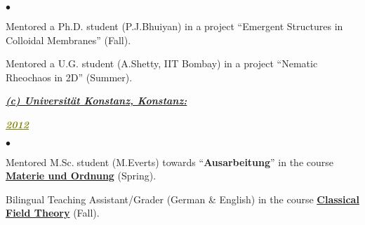 \documentclass[margin,line]{res}
\newenvironment{list1}{
  \begin{list}{\ding{113}}{%
      \setlength{\itemsep}{0in}
      \setlength{\parsep}{0in} \setlength{\parskip}{0in}
      \setlength{\topsep}{0in} \setlength{\partopsep}{0in} 
      \setlength{\leftmargin}{0.17in}}}{\end{list}}
\newenvironment{list2}{
  \begin{list}{$\bullet$}{%
      \setlength{\itemsep}{0in}
      \setlength{\parsep}{0in} \setlength{\parskip}{0in}
      \setlength{\topsep}{0in} \setlength{\partopsep}{0in} 
      \setlength{\leftmargin}{0.2in}}}{\end{list}}
\begin{document}
\begin{resume}
\begin{list1}
\vspace{1mm}
\end{list1}
\begin{list2}
\item Mentored a Ph.D. student (P.J.Bhuiyan) in a project ``{\sf Emergent Structures in Colloidal Membranes}'' (Fall). 
\item Mentored a U.G. student (A.Shetty, IIT Bombay) in a project ``{\sf Nematic Rheochaos in 2D}'' (Summer). 
\end{list2}
\begin{list1}
\vspace{1mm}
\item[] \textcolor{alizarin}{\underline{\textbf{\textit{(c) Universit\"at Konstanz, Konstanz:}}}}
\vspace{1mm}
\end{list1}
\begin{list1}
\item[] \textcolor{olive}{\underline{\textbf{\textit{2012}}}}
\vspace{1mm}
\end{list1}
\begin{list2}
\item Mentored M.Sc.$\;$student (M.Everts) towards ``{\bf Ausarbeitung}'' in the course 
      \href{http://cms.uni-konstanz.de/physik/fuchs/teaching/materie-und-ordnung/}{\bf Materie und Ordnung} (Spring). 
\item Bilingual Teaching Assistant/Grader (German \& English) in the course 
      \href{http://theorie.physik.uni-konstanz.de/thomas/stud/classfield/}{\bf Classical Field Theory} (Fall).  
\end{list2}
\vspace{1mm}


\end{resume}
\end{document}
